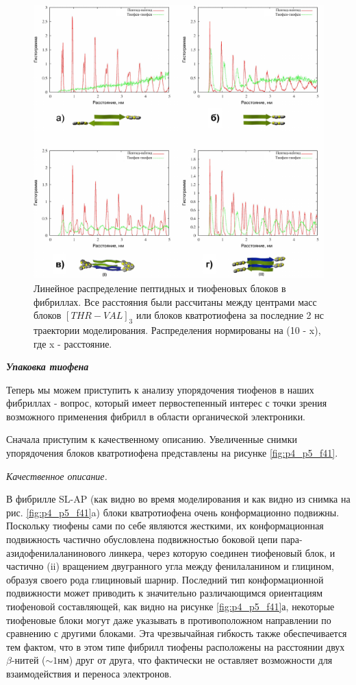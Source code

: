 \begin{figure} [H]
    \centering
    \includegraphics[width=\textwidth]{images/p4/punkt5/part4_p5_f40.pdf}
    \caption[Линейное распределение пептидных и тиофеновых блоков в фибриллах]{Линейное распределение пептидных и тиофеновых блоков в фибриллах. Все расстояния были рассчитаны между центрами масс блоков $[THR-VAL]_3$ или блоков кватротиофена за последние 2 нс траектории моделирования. Распределения нормированы на (10 - x), где x - расстояние.}
    \label{fig:p4_p5_f40}
\end{figure}


    \emph{\textbf{Упаковка тиофена}}

    Теперь мы можем приступить к анализу упорядочения тиофенов в наших фибриллах - вопрос, который имеет первостепенный интерес с точки зрения возможного применения фибрилл в области органической электроники.
    
    Сначала приступим к качественному описанию. Увеличенные снимки упорядочения блоков кватротиофена представлены на рисунке \ref{fig:p4_p5_f41}.

    \emph{Качественное описание.}
    
    В фибрилле SL-AP (как видно во время моделирования и как видно из снимка на рис. \ref{fig:p4_p5_f41}a) блоки кватротиофена очень конформационно подвижны. Поскольку тиофены сами по себе являются жесткими, их конформационная подвижность частично обусловлена подвижностью боковой цепи пара-азидофенилаланинового линкера, через которую соединен тиофеновый блок, и частично (ii) вращением двугранного угла между фенилаланином и глицином, образуя своего рода глициновый шарнир. Последний тип конформационной подвижности может приводить к значительно различающимся ориентациям тиофеновой составляющей, как видно на рисунке \ref{fig:p4_p5_f41}а, некоторые тиофеновые блоки могут даже указывать в противоположном направлении по сравнению с другими блоками. Эта чрезвычайная гибкость также обеспечивается тем фактом, что в этом типе фибрилл тиофены расположены на расстоянии двух $\beta$-нитей ($\sim 1$нм) друг от друга, что фактически не оставляет возможности для взаимодействия и переноса электронов.

